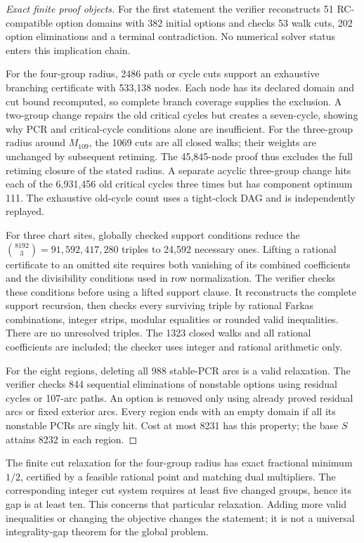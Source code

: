 \begin{proof}[Exact finite proof objects]
For the first statement the verifier reconstructs 51 RC-compatible
option domains with 382 initial options and checks 53 walk cuts,
202 option eliminations and a terminal contradiction. No numerical
solver status enters this implication chain.

For the four-group radius, 2486 path or cycle cuts support an
exhaustive branching certificate with 533,138 nodes. Each node
has its declared domain and cut bound recomputed, so complete
branch coverage supplies the exclusion. A two-group change
repairs the old critical cycles but creates a seven-cycle,
showing why PCR and critical-cycle conditions alone are insufficient.
For the three-group radius around $M_{109}$, the 1069 cuts are
all closed walks; their weights are unchanged by subsequent
retiming. The 45,845-node proof thus excludes the full retiming
closure of the stated radius. A separate acyclic three-group
change hits each of the 6,931,456 old critical cycles three
times but has component optimum 111. The exhaustive old-cycle
count uses a tight-clock DAG and is independently replayed.

For three chart sites, globally checked support conditions reduce
the $\binom{8192}{3}=91,592,417,280$ triples to 24,592 necessary
ones. Lifting a rational certificate to an omitted site requires
both vanishing of its combined coefficients and the divisibility
conditions used in row normalization. The verifier checks these
conditions before using a lifted support clause. It reconstructs
the complete support recursion, then checks every surviving triple
by rational Farkas combinations, integer strips, modular equalities
or rounded valid inequalities. There are no unresolved triples.
The 1323 closed walks and all rational coefficients are included;
the checker uses integer and rational arithmetic only.

For the eight regions, deleting all 988 stable-PCR arcs is a valid
relaxation. The verifier checks 844 sequential eliminations of
nonstable options using residual cycles or 107-arc paths. An
option is removed only using already proved residual arcs or
fixed exterior arcs. Every region ends with an empty domain if
all its nonstable PCRs are singly hit. Cost at most 8231 has
this property; the base $S$ attains 8232 in each region.
\end{proof}

The finite cut relaxation for the four-group radius has exact
fractional minimum $1/2$, certified by a feasible rational point
and matching dual multipliers. The corresponding integer cut
system requires at least five changed groups, hence its gap is
at least ten. This concerns that particular relaxation. Adding
more valid inequalities or changing the objective changes the
statement; it is not a universal integrality-gap theorem for
the global problem.

